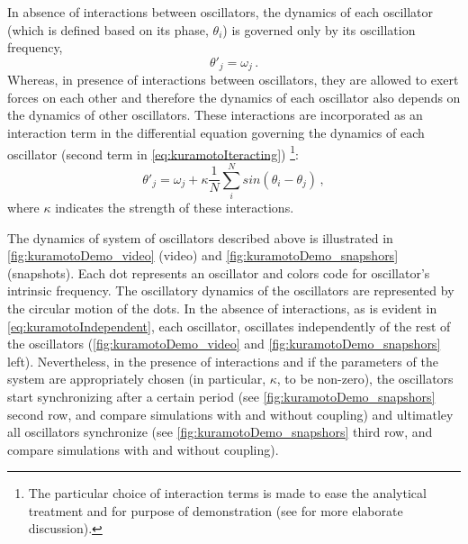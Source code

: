 In absence of interactions between oscillators, the dynamics of each oscillator
(which is defined based on its phase, $\theta_i$) is governed only by its  oscillation frequency,
\begin{equation}
  \label{eq:kuramotoIndependent}
  \theta'_j = \omega_j\,.
\end{equation}
Whereas, in  presence of interactions between oscillators,
they are allowed to exert forces on each other and therefore the dynamics of each oscillator also depends on the dynamics of other oscillators.
These interactions are incorporated as an interaction term in the differential equation governing the dynamics of each oscillator (second term in \autoref{eq:kuramotoIteracting})
\footnote{
  The particular choice of interaction terms is made to ease the analytical treatment and for purpose of demonstration
(see \cite{kuramotoSelfentrainmentPopulationCoupled1975,kuramotoChemicalOscillationsWaves2003} for more elaborate discussion).
}:
\begin{equation}
  \label{eq:kuramotoIteracting}
  \theta'_j = \omega_j + \kappa \frac{1}{N} \sum_i^N sin(\theta_i - \theta_j)\,,
\end{equation}
where $\kappa$ indicates the strength of these interactions.

The dynamics of system of oscillators described above is illustrated in \autoref{fig:kuramotoDemo_video} (video) and \autoref{fig:kuramotoDemo_snapshors} (snapshots).
Each dot represents an oscillator and colors code for oscillator's intrinsic frequency.
The oscillatory dynamics of the oscillators are represented by the circular motion of the dots.
In the absence of interactions, as is evident in \autoref{eq:kuramotoIndependent},
each oscillator, oscillates independently of the rest of the oscillators
(\autoref{fig:kuramotoDemo_video} and \autoref{fig:kuramotoDemo_snapshors} left).
Nevertheless, in the presence of interactions and if the parameters of the system
are appropriately chosen (in particular,  $\kappa$, to be non-zero),
the oscillators start synchronizing after a certain period
(see \autoref{fig:kuramotoDemo_snapshors} second row, and compare simulations with and without coupling) and ultimatley all oscillators synchronize
(see \autoref{fig:kuramotoDemo_snapshors} third row, and compare simulations with and without coupling).

